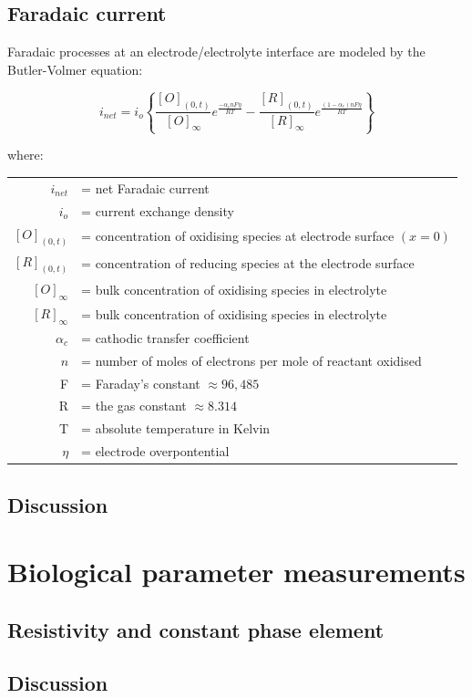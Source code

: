     \subsection{Faradaic current}

        Faradaic processes at an electrode/electrolyte interface are modeled
        by the Butler-Volmer equation:

        \begin{equation}
        i_{net}=i_{o}\left\{ \frac{[O]_{(0,t)}}{[O]_{\infty}}e^{\frac{-\alpha_{c}nF\eta}{RT}}-\frac{[R]_{(0,t)}}{[R]_{\infty}}e^{\frac{(1-\alpha_{c})nF\eta}{RT}}\right\}
        \end{equation}


        where:

        \begin{tabular}{rl}
        $i_{net}$ & = net Faradaic current\tabularnewline
        $i_{o}$ & = current exchange density\tabularnewline
        $[O]_{(0,t)}$ & = concentration of oxidising species at electrode surface $(x=0)$\tabularnewline
        $[R]_{(0,t)}$ & = concentration of reducing species at the electrode surface\tabularnewline
        $[O]_{\infty}$ & = bulk concentration of oxidising species in electrolyte\tabularnewline
        $[R]_{\infty}$ & = bulk concentration of oxidising species in electrolyte\tabularnewline
        $\alpha_{c}$ & = cathodic transfer coefficient\tabularnewline
        $n$ & = number of moles of electrons per mole of reactant oxidised\tabularnewline
        F & = Faraday's constant $\approx96,485$\tabularnewline
        R & = the gas constant $\approx8.314$\tabularnewline
        T & = absolute temperature in Kelvin\tabularnewline
        $\eta$ & = electrode overpontential\tabularnewline
        \end{tabular}


    \subsection{Discussion}

\section{Biological parameter measurements}
    \label{sect:sheep_measurements}
    \subsection{Resistivity and constant phase element}
    \subsection{Discussion}

